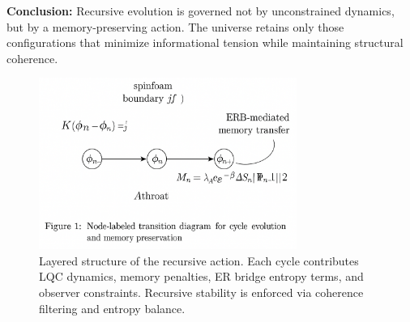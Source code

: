 \textbf{Conclusion:} Recursive evolution is governed not by unconstrained dynamics, but by a memory-preserving action. The universe retains only those configurations that minimize informational tension while maintaining structural coherence.

\begin{figure}[H]
\centering
\includegraphics[width=0.75\textwidth]{figures/recursive_action_layers.png}
\caption{Layered structure of the recursive action. Each cycle contributes LQC dynamics, memory penalties, ER bridge entropy terms, and observer constraints. Recursive stability is enforced via coherence filtering and entropy balance.}
\label{fig:recursive-action-layers}
\end{figure}
